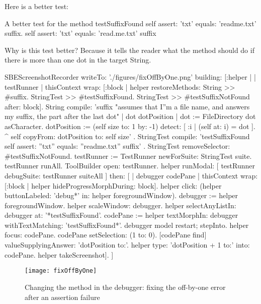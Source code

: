 \documentclass[a4paper,10pt,twoside]{book}
\begin{document}
Here is a better test:

\begin{method}[testSuffix2]{A better test for the  method}
testSuffixFound
	self assert: 'txt' equals: 'readme.txt' suffix.
	self assert: 'txt' equals: 'read.me.txt' suffix
\end{method}
\noindent
Why is this test better?  Because it tells the reader what the method should do if there is more than one dot in the target String.


\begin{ExecuteSmalltalkScript}
SBEScreenshotRecorder writeTo: './figures/fixOffByOne.png' building: [:helper |
	| testRunner |
	thisContext wrap: [:block | helper restoreMethods: {
			String >> #suffix.
			StringTest >> #testSuffixFound.
			StringTest >> #testSuffixNotFound }
		after: block].
	String compile: 'suffix
"assumes that I''m a file name, and answers my suffix, the part after the last dot"
| dot dotPosition |
dot := FileDirectory dot asCharacter.
dotPosition := (self size to: 1 by: -1) detect: [ :i | (self at: i) = dot ].
^ self copyFrom: dotPosition to: self size'
.
	StringTest compile: 'testSuffixFound
self assert: ''txt'' equals: ''readme.txt'' suffix'
.
	StringTest removeSelector: #testSuffixNotFound.
	testRunner := TestRunner newForSuite: StringTest suite.
	testRunner runAll.
	ToolBuilder open: testRunner.
	helper
		runModal: [ testRunner debugSuite: testRunner suiteAll ]
		then: [
			| debugger codePane |
			thisContext wrap: [:block | helper hideProgressMorphDuring: block].
			helper click: (helper buttonLabeled: 'debug*' in: helper foregroundWindow).
			debugger := helper foregroundWindow.
			helper scaleWindow: debugger.
			helper selectAnyListIn: debugger at: '*testSuffixFound'.
			codePane := helper textMorphIn: debugger withTextMatching: 'testSuffixFound*'.
			debugger model restart; stepInto.
			helper focus: codePane.
			codePane setSelection: (1 to: 0).
			[codePane find]
				valueSupplyingAnswer: 'dotPosition to:'.
			helper type: 'dotPosition + 1 to:' into: codePane.
			helper takeScreenshot].
]
\end{ExecuteSmalltalkScript}
\begin{figure}[btp]
	\begin{center}
		\texttt{[image: fixOffByOne]}
	\end{center}
	\caption{Changing the  method in the debugger: fixing the off-by-one error after an \sunit assertion failure}
	\label{fig:fixOffByOne}
\end{figure}
\end{document}
